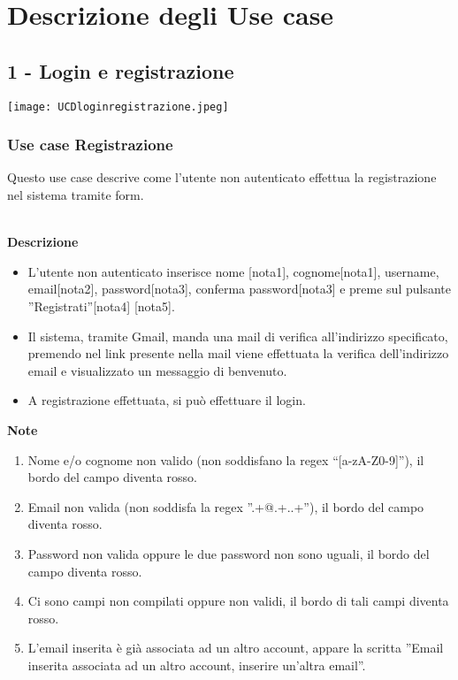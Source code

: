 \documentclass[a4paper,12pt]{article}
\begin{document}
\section*{Descrizione degli Use case }


\subsection*{1 - Login e registrazione}

\begin{center}
  \texttt{[image: UCDloginregistrazione.jpeg]}
\end{center}

\subsubsection*{Use case Registrazione}

Questo use case descrive come l'utente non autenticato effettua la registrazione nel sistema tramite form.



\textbf{\\Descrizione}
\begin{itemize} \setlength\itemsep{0.01em}
\item L'utente non autenticato inserisce nome [nota1], cognome[nota1], username, email[nota2], password[nota3], conferma password[nota3] e preme sul pulsante ''Registrati''[nota4] [nota5].
\item Il sistema, tramite Gmail, manda una mail di verifica all'indirizzo specificato, premendo nel link presente nella mail viene effettuata la verifica dell'indirizzo email e visualizzato un messaggio di benvenuto.
\item A registrazione effettuata, si può effettuare il login.
\end{itemize}

\textbf{Note}
\begin{enumerate} \setlength\itemsep{0.01em}
\item Nome e/o cognome non valido (non soddisfano la regex ``[a-zA-Z0-9]''), il bordo del campo diventa rosso.
\item Email non valida (non soddisfa la regex ''.+@.+..+''), il bordo del campo diventa rosso.
\item Password non valida oppure le due password non sono uguali, il bordo del campo diventa rosso.
\item Ci sono campi non compilati oppure non validi, il bordo di tali campi diventa rosso.
\item L'email inserita è già associata ad un altro account, appare la scritta ''Email inserita associata ad un altro account, inserire un'altra email''.
\end{enumerate}
\end{document}
